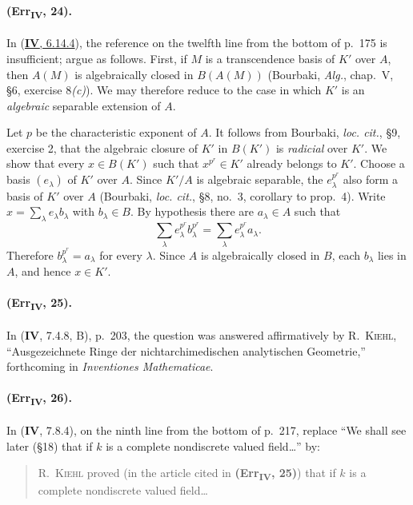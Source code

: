 \paragraph{(Err\textsubscript{\textmd{IV}}, 24).}
In ({\hyperref[IV.6.14.4]{\textbf{IV}, 6.14.4}}), the reference on the twelfth line from the bottom of
p.~175 is insufficient; argue as follows.  First, if $M$ is a
transcendence basis of $K'$ over $A$, then $A(M)$ is algebraically closed
in $B(A(M))$ (Bourbaki, \emph{Alg.}, chap.~V, \S6, exercise 8\emph{(c)}).  We
may therefore reduce to the case in which $K'$ is an \emph{algebraic} separable
extension of $A$.

Let $p$ be the characteristic exponent of $A$.  It follows from
Bourbaki, \emph{loc. cit.}, \S9, exercise 2, that the algebraic closure
of $K'$ in $B(K')$ is \emph{radicial} over $K'$.  We show that every
$x\in B(K')$ such that $x^{p^r}\in K'$ already belongs to $K'$.
Choose a basis $(e_\lambda)$ of $K'$ over $A$.  Since $K'/A$ is
algebraic separable, the $e_\lambda^{p^r}$ also form a basis of $K'$ over
$A$ (Bourbaki, \emph{loc. cit.}, \S8, no.~3, corollary to prop.~4).
Write $x=\sum_\lambda e_\lambda b_\lambda$ with $b_\lambda\in B$.  By
hypothesis there are $a_\lambda\in A$ such that
\[
 \sum_\lambda e_\lambda^{p^r}b_\lambda^{p^r}
 =\sum_\lambda e_\lambda^{p^r}a_\lambda.
\]
Therefore $b_\lambda^{p^r}=a_\lambda$ for every $\lambda$.  Since $A$
is algebraically closed in $B$, each $b_\lambda$ lies in $A$, and hence
$x\in K'$.

\paragraph{(Err\textsubscript{\textmd{IV}}, 25).}
In (\textbf{IV}, 7.4.8, B), p.~203, the question was answered affirmatively by
R.~\textsc{Kiehl}, ``Ausgezeichnete Ringe der nichtarchimedischen analytischen
Geometrie,'' forthcoming in \emph{Inventiones Mathematicae}.

\paragraph{(Err\textsubscript{\textmd{IV}}, 26).}
In (\textbf{IV}, 7.8.4), on the ninth line from the bottom of p.~217, replace
``We shall see later (\S18) that if $k$ is a complete nondiscrete valued
field\ldots'' by:
\begin{quote}
R.~\textsc{Kiehl} proved (in the article cited in
\textbf{(Err\textsubscript{\textmd{IV}}, 25)}) that if $k$ is a complete nondiscrete
valued field\ldots
\end{quote}

